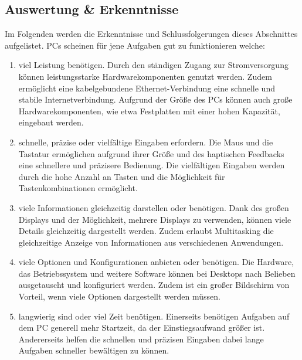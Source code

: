 \subsection{Auswertung \& Erkenntnisse}
Im Folgenden werden die Erkenntnisse und Schlussfolgerungen dieses Abschnittes aufgelistet. %
%
\newline%
\myNewSection%
PCs scheinen für jene Aufgaben gut zu funktionieren welche: %
\begin{enumerate}%
	\item viel Leistung benötigen.\newline%
	Durch den ständigen Zugang zur Stromversorgung können leistungsstarke Hardwarekomponenten genutzt werden. Zudem ermöglicht eine kabelgebundene Ethernet-Verbindung eine schnelle und stabile Internetverbindung. Aufgrund der Größe des PCs können auch große Hardwarekomponenten, wie etwa Festplatten mit einer hohen Kapazität, eingebaut werden.%
	\item schnelle, präzise oder vielfältige Eingaben erfordern.\newline%
	Die Maus und die Tastatur ermöglichen aufgrund ihrer Größe und des haptischen Feedbacks eine schnellere und präzisere Bedienung. Die vielfältigen Eingaben werden durch die hohe Anzahl an Tasten und die Möglichkeit für Tastenkombinationen ermöglicht.%
	\item viele Informationen gleichzeitig darstellen oder benötigen.\newline%
	Dank des großen Displays und der Möglichkeit, mehrere Displays zu verwenden, können viele Details gleichzeitig dargestellt werden. Zudem erlaubt Multitasking die gleichzeitige Anzeige von Informationen aus verschiedenen Anwendungen.%
	\item viele Optionen und Konfigurationen anbieten oder benötigen.\newline%
	Die Hardware, das Betriebssystem und weitere Software können bei Desktops nach Belieben ausgetauscht und konfiguriert werden. Zudem ist ein großer Bildschirm von Vorteil, wenn viele Optionen dargestellt werden müssen.%
	\item langwierig sind oder viel Zeit benötigen.\newline%
	Einerseits benötigen Aufgaben auf dem PC generell mehr Startzeit, da der Einstiegsaufwand größer ist. Andererseits helfen die schnellen und präzisen Eingaben dabei lange Aufgaben schneller bewältigen zu können.%
\end{enumerate}%
